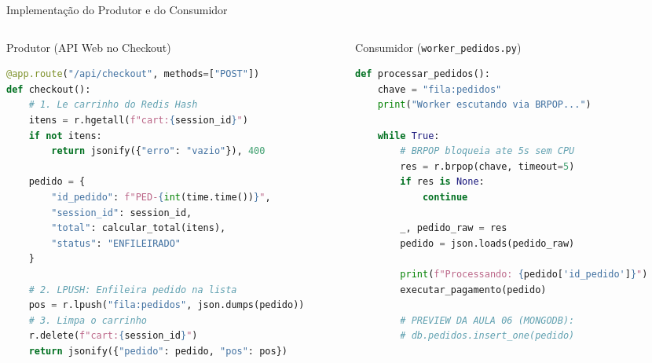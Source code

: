 \begin{frame}[fragile]{Implementação do Produtor e do Consumidor}
  \vspace{0.1cm}
  \begin{columns}[t]
    \begin{column}{0.48\textwidth}
      \footnotesize
      \alert{Produtor (API Web no Checkout)}\par
      \vspace{0.1cm}
\begin{lstlisting}[language=Python,basicstyle=\fontsize{4.6pt}{5.6pt}\selectfont\ttfamily]
@app.route("/api/checkout", methods=["POST"])
def checkout():
    # 1. Le carrinho do Redis Hash
    itens = r.hgetall(f"cart:{session_id}")
    if not itens:
        return jsonify({"erro": "vazio"}), 400

    pedido = {
        "id_pedido": f"PED-{int(time.time())}",
        "session_id": session_id,
        "total": calcular_total(itens),
        "status": "ENFILEIRADO"
    }
    
    # 2. LPUSH: Enfileira pedido na lista
    pos = r.lpush("fila:pedidos", json.dumps(pedido))
    # 3. Limpa o carrinho
    r.delete(f"cart:{session_id}")
    return jsonify({"pedido": pedido, "pos": pos})
\end{lstlisting}
    \end{column}

    \begin{column}{0.48\textwidth}
      \alert{Consumidor (\texttt{worker\_pedidos.py})}\par
      \vspace{0.1cm}
\begin{lstlisting}[language=Python,basicstyle=\fontsize{4.6pt}{5.6pt}\selectfont\ttfamily]
def processar_pedidos():
    chave = "fila:pedidos"
    print("Worker escutando via BRPOP...")
    
    while True:
        # BRPOP bloqueia ate 5s sem CPU
        res = r.brpop(chave, timeout=5)
        if res is None:
            continue
            
        _, pedido_raw = res
        pedido = json.loads(pedido_raw)
        
        print(f"Processando: {pedido['id_pedido']}")
        executar_pagamento(pedido)
        
        # PREVIEW DA AULA 06 (MONGODB):
        # db.pedidos.insert_one(pedido)
\end{lstlisting}
    \end{column}
  \end{columns}
\end{frame}
